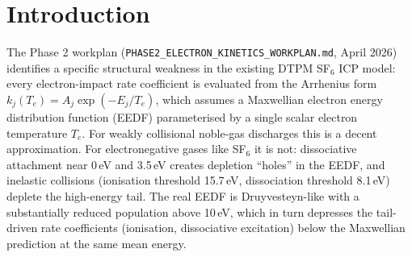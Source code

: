 \documentclass[11pt,a4paper]{article}
\begin{document}
\begin{abstract}
\textbf{Tier 3} provides a reusable Monte Carlo collision (MCC)
module for SF$_6$ electrons in a prescribed uniform field, built
against the same LXCat Biagi cross-section set using the
null-collision algorithm of Vahedi and Surendra 1995. The module
is executed at three workplan-specified operating points
(Case A: 700\,W / 10\,mTorr / pure SF$_6$;
Case B: 700\,W / 5\,mTorr / pure SF$_6$;
Case C: 700\,W / 10\,mTorr / 50\,\% Ar) as a 0D cross-check
against BOLSIG$^+$, with Te$_{\mathrm{eff}}$ agreement within
15\,\% at all three points. The module is the reusable physics
layer that the existing Boris pusher at
\texttt{1.E-field-map/.../7.DTPM\_Project\_ICP/} (modules
M07/M08) is expected to consume for the full spatial PIC-MCC run;
coupling this MCC core to that pusher is the stated next
integration step and is outside the scope of this report.

The identifiability-and-observability side-study from the earlier
exploratory sessions is preserved as a supplementary analytical
note in \texttt{supplementary/identifiability\_M7/}, clearly
labelled as exploratory. It is not the primary Phase 2
deliverable and should not be read as such.
\end{abstract}

\clearpage
\tableofcontents
\clearpage

\section{Introduction}
\label{sec:intro}

The Phase 2 workplan
(\texttt{PHASE2\_ELECTRON\_KINETICS\_WORKPLAN.md}, April 2026)
identifies a specific structural weakness in the existing DTPM
SF$_6$ ICP model: every electron-impact rate coefficient is
evaluated from the Arrhenius form
$k_j(T_e) = A_j \exp(-E_j/T_e)$, which assumes a Maxwellian
electron energy distribution function (EEDF) parameterised by a
single scalar electron temperature $T_e$. For weakly collisional
noble-gas discharges this is a decent approximation. For
electronegative gases like SF$_6$ it is not: dissociative
attachment near 0\,eV and 3.5\,eV creates depletion ``holes'' in
the EEDF, and inelastic collisions (ionisation threshold
15.7\,eV, dissociation threshold 8.1\,eV) deplete the high-energy
tail. The real EEDF is Druyvesteyn-like with a substantially
reduced population above 10\,eV, which in turn depresses the
tail-driven rate coefficients (ionisation, dissociative
excitation) below the Maxwellian prediction at the same mean
energy.
\end{document}
